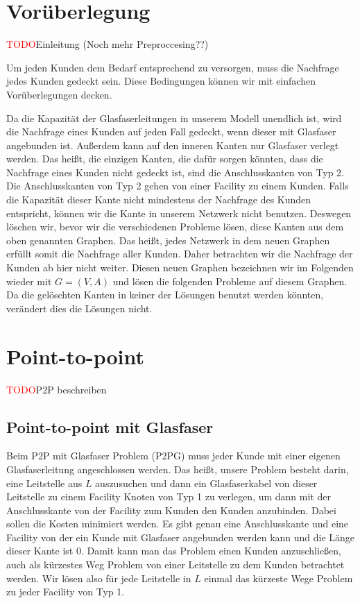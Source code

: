 \documentclass[11pt,a4paper]{article}
\newcommand{\TODO}{\textcolor{red}{TODO}}
\theoremstyle{my_th_style1}
\begin{document}
\section{Vorüberlegung}
\label{preprocess}
\TODO Einleitung (Noch mehr Preproccesing??)

Um jeden Kunden dem Bedarf entsprechend zu versorgen, muss die Nachfrage jedes Kunden gedeckt sein.
Diese Bedingungen k\"onnen wir mit einfachen Vor\"uberlegungen decken.

Da die Kapazität der Glasfaserleitungen in unserem Modell unendlich ist, wird die Nachfrage eines Kunden auf jeden Fall gedeckt, wenn dieser mit Glasfaser angebunden ist.
Außerdem kann auf den inneren Kanten nur Glasfaser verlegt werden. Das heißt, die einzigen Kanten, die dafür sorgen könnten, dass die Nachfrage eines Kunden nicht gedeckt ist, sind die Anschlusskanten von Typ 2.
Die Anschlusskanten von Typ 2 gehen von einer Facility zu einem Kunden.
Falls die Kapazit\"at dieser Kante nicht mindestens der Nachfrage des Kunden entspricht, können wir die Kante in unserem Netzwerk nicht benutzen. 
Deswegen löschen wir, bevor wir die verschiedenen Probleme lösen, diese Kanten aus dem oben genannten Graphen.
Das heißt, jedes Netzwerk in dem neuen Graphen erfüllt somit die Nachfrage aller Kunden.
Daher betrachten wir die Nachfrage der Kunden ab hier nicht weiter.
Diesen neuen Graphen bezeichnen wir im Folgenden wieder mit $G=(V,A)$ und lösen die folgenden Probleme auf diesem Graphen.
Da die gelöschten Kanten in keiner der Lösungen benutzt werden könnten, verändert dies die Lösungen nicht.

\section{Point-to-point}

\TODO P2P beschreiben

\subsection{Point-to-point mit Glasfaser}

Beim P2P mit Glasfaser Problem (P2PG) muss jeder Kunde mit einer eigenen Glasfaserleitung angeschlossen werden. Das heißt, unsere Problem besteht darin, eine Leitstelle aus $L$ auszusuchen und dann ein Glasfaserkabel von dieser Leitstelle zu einem Facility Knoten von Typ 1 zu verlegen, um dann mit der Anschlusskante von der Facility zum Kunden den Kunden anzubinden. Dabei sollen die Kosten minimiert werden. Es gibt genau eine Anschlusskante und eine Facility von der ein Kunde mit Glasfaser angebunden werden kann und die Länge dieser Kante ist 0. Damit kann man das Problem einen Kunden anzuschließen, auch als kürzestes Weg Problem von einer Leitstelle zu dem Kunden betrachtet werden. Wir lösen also für jede Leitstelle in $L$ einmal das kürzeste Wege Problem zu jeder Facility von Typ 1.
\end{document}
